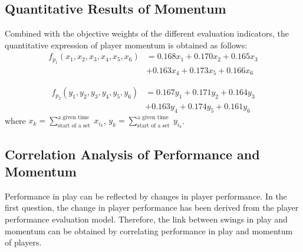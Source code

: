 \documentclass[12pt]{article}  %
\begin{document}
\begin{table}[htbp]
	\centering
	\caption{Weights of different evaluation indicators}
	\label{1}
\end{table}
\vspace{-0.5cm}

\subsection{Quantitative Results of Momentum}
Combined with the objective weights of the different evaluation indicators, the quantitative expression of player momentum is obtained as follows:
\begin{equation}
	\begin{aligned}
		f_{p_1}\left(x_1, x_2, x_3, x_4, x_5, x_6\right)&=  0.168 x_1+0.170 x_2+0.165 x_3 \\
		&+ 0.163 x_4+0.173 x_5+0.166 x_6
	\end{aligned}
\end{equation}

\begin{equation}
	\begin{aligned}
		f_{p_2}\left(y_1, y_2, y_3, y_4, y_5, y_6\right)&=  0.167 y_1+0.171 y_2+0.164 y_3 \\
		&+ 0.163 y_4+0.174 y_5+0.161 y_6
	\end{aligned}
\end{equation}
where $x_k=\sum_{\text {start of a set }}^{\text {a given time }} x_{i_k}$, $y_k=\sum_{\text {start of a set }}^{\text {a given time }} y_{i_k}$.

\subsection{Correlation Analysis of Performance and Momentum}
Performance in play can be reflected by changes in player performance. In the first question, the change in player performance has been derived from the player performance evaluation model. Therefore, the link between swings in play and momentum can be obtained by correlating performance in play and momentum of players.
\end{document}
